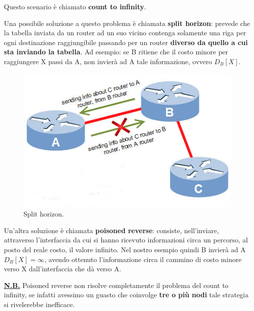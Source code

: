 \documentclass[11pt,a4paper,oneside]{book}
\theoremstyle{definition}
\begin{document}
Questo scenario è chiamato \textbf{count to infinity}.

Una possibile soluzione a questo problema è chiamata \textbf{split horizon}: prevede che la tabella inviata da un router ad un suo vicino contenga solamente una riga per ogni destinazione raggiungibile passando per un router \textbf{diverso da quello a cui sta inviando la tabella}. Ad esempio: se B ritiene che il costo minore per raggiungere X passi da A, non invierà ad A tale informazione, ovvero $D_{B}[X]$.

\begin{figure}[!h]
	\centering
	\includegraphics[scale=0.5]{Immagini/split-horizon.jpg}
	\caption{Split horizon.}
\end{figure}

\pagebreak

Un'altra soluzione è chiamata \textbf{poisoned reverse}: consiste, nell'inviare, attraverso l'interfaccia da cui si hanno ricevuto informazioni circa un percorso, al posto del reale costo, il valore infinito. Nel nostro esempio quindi B invierà ad A $D_{B}[X] = \infty$, avendo ottenuto l'informazione circa il cammino di costo minore verso X dall'interfaccia che dà verso A.

\textbf{\underline{N.B.}} Poisoned reverse non risolve completamente il problema del count to infinity, se infatti avessimo un guasto che coinvolge \textbf{tre o più nodi} tale strategia si rivelerebbe inefficace.
\end{document}
